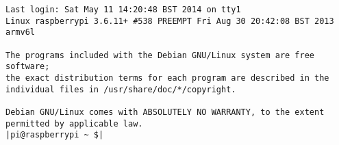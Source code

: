 \begin{lstlisting}
Last login: Sat May 11 14:20:48 BST 2014 on tty1                                                                                                   Linux raspberrypi 3.6.11+ #538 PREEMPT Fri Aug 30 20:42:08 BST 2013 armv6l

The programs included with the Debian GNU/Linux system are free software;
the exact distribution terms for each program are described in the
individual files in /usr/share/doc/*/copyright.

Debian GNU/Linux comes with ABSOLUTELY NO WARRANTY, to the extent
permitted by applicable law.
|pi@raspberrypi ~ $|
\end{lstlisting}

